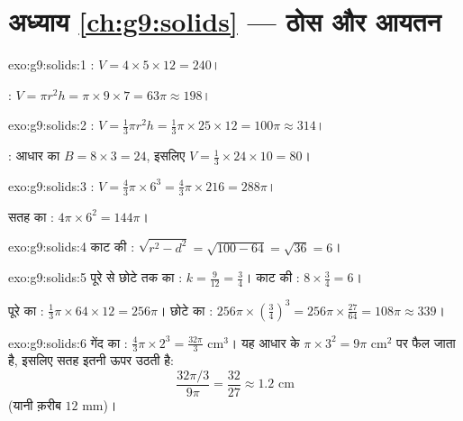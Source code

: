 \section*{अध्याय \ref{ch:g9:solids} --- ठोस और आयतन}

\begin{solution}{exo:g9:solids:1}
: $V = 4 \times 5 \times 12 = 240$।

: $V = \pi r^2 h = \pi \times 9 \times 7 = 63\pi \approx 198$।
\end{solution}

\begin{solution}{exo:g9:solids:2}
: $V = \frac13 \pi r^2 h = \frac13 \pi \times 25 \times 12 =
100\pi \approx 314$।

: आधार का  $B = 8 \times 3 = 24$, इसलिए
$V = \frac13 \times 24 \times 10 = 80$।
\end{solution}

\begin{solution}{exo:g9:solids:3}
: $V = \frac43 \pi \times 6^3 = \frac43 \pi \times 216 = 288\pi$।

सतह का : $4\pi \times 6^2 = 144\pi$।
\end{solution}

\begin{solution}{exo:g9:solids:4}
काट की : $\sqrt{r^2 - d^2} = \sqrt{100 - 64} = \sqrt{36}
= 6$।
\end{solution}

\begin{solution}{exo:g9:solids:5}
पूरे  से छोटे  तक का :
$k = \frac{9}{12} = \frac34$। काट की : $8 \times \frac34 = 6$।

पूरे  का : $\frac13\pi \times 64 \times 12 = 256\pi$।
छोटे  का : $256\pi \times \left(\frac34\right)^3 =
256\pi \times \frac{27}{64} = 108\pi \approx 339$।
\end{solution}

\begin{solution}{exo:g9:solids:6}
गेंद का : $\frac43\pi \times 2^3 = \frac{32\pi}{3}$ cm$^3$। यह
 आधार के  $\pi \times 3^2 = 9\pi$ cm$^2$ पर फैल जाता
है, इसलिए सतह इतनी ऊपर उठती है:
\[
\frac{32\pi/3}{9\pi} = \frac{32}{27} \approx 1.2 \text{ cm}
\]
(यानी क़रीब $12$ mm)।
\end{solution}

